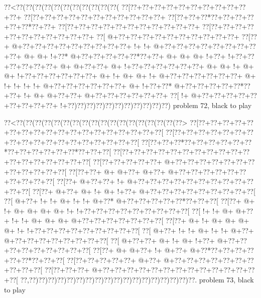 \vbox{\vbox{\goo
\0??<\0??(\0??(\0??(\0??(\0??(\0??(\0??(\0??(\0??(\0??(\0??(
\0??[\0??+\0??+\0??+\0??+\0??+\0??+\0??+\0??+\0??+\0??+\0??+
\0??[\0??+\0??+\0??+\0??+\0??+\0??+\0??+\0??+\0??+\0??+\0??+
\0??[\0??+\0??+\0??*\0??+\0??+\0??+\0??+\0??+\0??*\0??+\0??+
\0??[\0??+\0??+\0??+\0??+\0??+\0??+\0??+\0??+\0??+\0??+\0??+
\0??[\0??+\0??+\0??+\0??+\0??+\0??+\0??+\0??+\0??+\0??+\0??+
\0??[\- @+\0??+\0??+\0??+\0??+\0??+\0??+\0??+\0??+\0??+\0??+
\0??[\0??+\- @+\0??+\0??+\0??+\0??+\0??+\0??+\0??+\0??+\0??+
\- !+\- !+\- @+\0??+\0??+\0??+\0??+\0??+\0??+\0??+\0??+\0??+
\- @+\- @+\- !+\0??*\- @+\0??+\0??+\0??+\0??+\0??*\0??+\0??+
\- @+\- @+\- @+\- !+\0??+\- !+\0??+\0??+\0??+\0??+\0??+\0??+
\- @+\- @+\0??+\0??+\- @+\- !+\0??+\0??+\0??+\0??+\0??+\0??+
\- @+\- @+\- !+\- @+\- @+\- !+\0??+\0??+\0??+\0??+\0??+\0??+
\- @+\- !+\- @+\- @+\- !+\- @+\0??+\0??+\0??+\0??+\0??+\0??+
\- @+\- !+\- !+\- !+\- !+\- @+\0??+\0??+\0??+\0??+\0??+\0??+
\- @+\- !+\0??+\0??*\- @+\0??+\0??+\0??+\0??+\0??*\0??+\0??+
\- !+\- @+\- @+\0??+\0??+\- @+\0??+\0??+\0??+\0??+\0??+\0??+
\0??[\- !+\- @+\0??+\0??+\0??+\0??+\0??+\0??+\0??+\0??+\0??+
\- !+\0??)\0??)\0??)\0??)\0??)\0??)\0??)\0??)\0??)\0??)\0??)
}
\hfil problem 72, black to play\hfil\break
}

\vbox{\vbox{\goo
\0??<\0??(\0??(\0??(\0??(\0??(\0??(\0??(\0??(\0??(\0??(\0??(\0??(\0??(\0??(\0??(\0??(\0??(\0??>
\0??[\0??+\0??+\0??+\0??+\0??+\0??+\0??+\0??+\0??+\0??+\0??+\0??+\0??+\0??+\0??+\0??+\0??+\0??[
\0??[\0??+\0??+\0??+\0??+\0??+\0??+\0??+\0??+\0??+\0??+\0??+\0??+\0??+\0??+\0??+\0??+\0??+\0??[
\0??[\0??+\0??+\0??*\0??+\0??+\0??+\0??+\0??+\0??*\0??+\0??+\0??+\0??+\0??+\0??*\0??+\0??+\0??[
\0??[\0??+\0??+\0??+\0??+\0??+\0??+\0??+\0??+\0??+\0??+\0??+\0??+\0??+\0??+\0??+\0??+\0??+\0??[
\0??[\0??+\0??+\0??+\0??+\0??+\- @+\0??+\0??+\0??+\0??+\0??+\0??+\0??+\0??+\0??+\0??+\0??+\0??[
\0??[\0??+\0??+\- @+\- @+\0??+\- @+\0??+\- @+\0??+\0??+\0??+\0??+\0??+\0??+\0??+\0??+\0??+\0??[
\0??[\0??+\- @+\0??+\0??+\- !+\- @+\0??+\0??+\0??+\0??+\0??+\0??+\0??+\0??+\0??+\0??+\0??+\0??[
\0??[\0??+\- @+\0??+\- @+\- !+\- @+\- !+\0??+\- @+\0??+\0??+\0??+\0??+\0??+\0??+\0??+\0??+\0??[
\0??[\- @+\0??+\- !+\- !+\- @+\- !+\- !+\- @+\0??*\- @+\0??+\0??+\0??+\0??+\0??*\0??+\0??+\0??[
\0??[\0??+\- @+\- !+\- @+\- @+\- @+\- @+\- !+\- !+\0??+\0??+\0??+\0??+\0??+\0??+\0??+\0??+\0??[
\0??[\- !+\- !+\- @+\- @+\0??+\- !+\- !+\- @+\- @+\- @+\- @+\0??+\0??+\0??+\0??+\0??+\0??+\0??[
\0??[\0??+\- @+\- !+\- @+\- @+\- @+\- @+\- !+\- !+\0??+\0??+\0??+\0??+\0??+\0??+\0??+\0??+\0??[
\0??[\- @+\0??+\- !+\- !+\- @+\- !+\- !+\- @+\0??+\- @+\0??+\0??+\0??+\0??+\0??+\0??+\0??+\0??[
\0??[\- @+\0??+\0??+\- @+\- !+\- @+\- !+\0??+\- @+\0??+\0??+\0??+\0??+\0??+\0??+\0??+\0??+\0??[
\0??[\0??+\- @+\- @+\0??+\- !+\- @+\0??+\- @+\0??*\0??+\0??+\0??+\0??+\0??+\0??*\0??+\0??+\0??[
\0??[\0??+\0??+\0??+\0??+\0??+\- @+\0??+\- @+\0??+\0??+\0??+\0??+\0??+\0??+\0??+\0??+\0??+\0??[
\0??[\0??+\0??+\0??+\- @+\0??+\0??+\0??+\0??+\0??+\0??+\0??+\0??+\0??+\0??+\0??+\0??+\0??+\0??[
\0??,\0??)\0??)\0??)\0??)\0??)\0??)\0??)\0??)\0??)\0??)\0??)\0??)\0??)\0??)\0??)\0??)\0??)\0??.
}
\hfil problem 73, black to play\hfil\break
}

